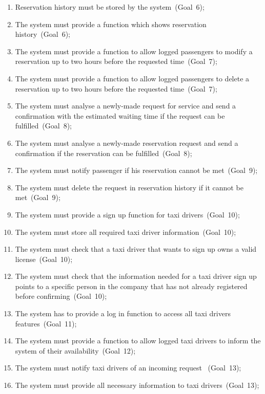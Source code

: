 \begin{enumerate}
\item Reservation history must be stored by the system~(Goal~6);
\item The system must provide a function which shows reservation history~(Goal~6);

\item The system must provide a function to allow logged passengers to modify a reservation up to two hours before the requested time~(Goal~7);
\item The system must provide a function to allow logged passengers to delete a reservation up to two hours before the requested time~(Goal~7);

\item The system must analyse a newly-made request for service and send a confirmation with the estimated waiting time if the request can be fulfilled~(Goal~8);
\item The system must analyse a newly-made reservation request and send a confirmation if the reservation can be fulfilled~(Goal~8);

\item The system must notify passenger if his reservation cannot be met~(Goal~9);
\item The system must delete the request in reservation history if it cannot be met~(Goal~9);

\item The system must provide a sign up function for taxi drivers~(Goal~10);
\item The system must store all required taxi driver information~(Goal~10);
\item The system must check that a taxi driver that wants to sign up owns a valid license~(Goal~10);
\item The system must check that the information needed for a taxi driver sign up points to a specific person in the company that has not already registered before confirming~(Goal~10);

\item The system has to provide a log in function to access all taxi drivers features~(Goal~11);

\item The system must provide a function to allow logged taxi drivers to inform the system of their availability~(Goal~12);

\item The system must notify taxi drivers of an incoming request ~(Goal~13);
\item The system must provide all necessary information to taxi drivers~(Goal~13);


\end{enumerate}
